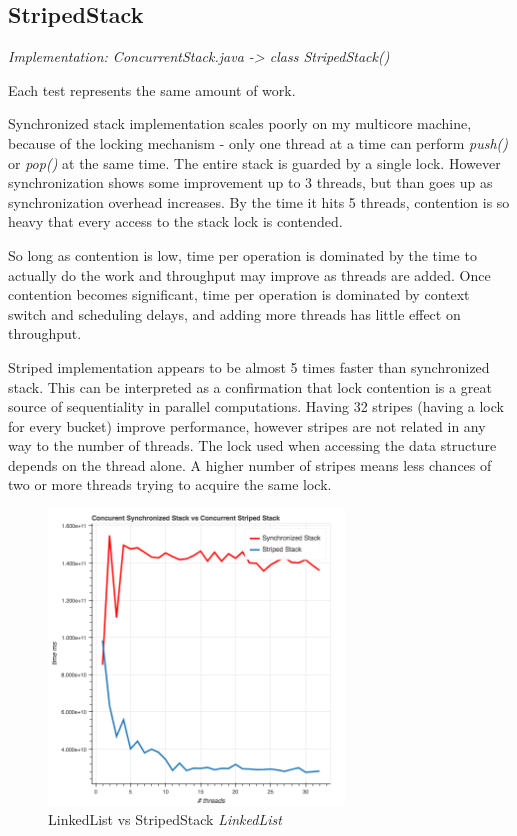 \documentclass[format=acmsmall, review=false, screen=true]{acmart}
\begin{document}
\subsection{StripedStack}

\textit{Implementation: ConcurrentStack.java -> class StripedStack()}

Each test represents the same amount of work.

Synchronized stack implementation scales poorly on my multicore machine, because
of the locking mechanism - only one thread at a time can perform \textit{push()} or \textit{pop()} at the same time. The entire stack is guarded by a single lock. However synchronization shows some improvement up to 3 threads, but than goes up as synchronization overhead increases. By the time it hits 5 threads, contention is so heavy that every access to the stack lock is contended.

So long as contention  is low, time  per operation is dominated by the time to actually do the work and throughput may improve as threads are added. Once contention becomes significant, time per  operation is dominated by context switch and scheduling delays, and adding more threads has  little  effect on throughput.

Striped implementation appears to be almost 5 times faster than synchronized stack.
This can be interpreted as a confirmation that lock contention is a great source of
sequentiality in parallel computations. Having 32 stripes (having a lock for every bucket) improve performance, however stripes are not related in any way to the number of threads. The lock used when accessing the data structure depends on the thread alone. A higher number of stripes means less chances of two or more threads trying to acquire the same lock.

\begin{figure}
  \includegraphics[width=0.7\textwidth]{linkedlist.png}
  \caption{LinkedList vs StripedStack \textit{LinkedList}}
  \label{fig:linkedlist}
\end{figure}
\end{document}
